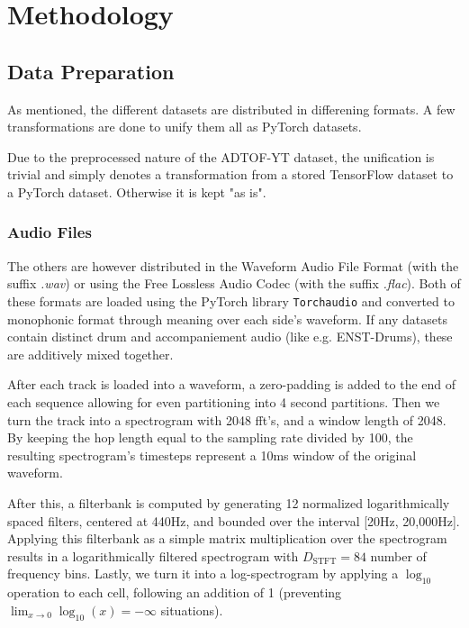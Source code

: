 \chapter{Methodology}

\section{Data Preparation}

As mentioned, the different datasets are distributed in differening formats. A few transformations are done to unify them all as PyTorch datasets.

Due to the preprocessed nature of the ADTOF-YT dataset, the unification is trivial and simply denotes a transformation from a stored TensorFlow dataset to a PyTorch dataset. Otherwise it is kept "as is".

\subsection{Audio Files}

The others are however distributed in the Waveform Audio File Format (with the suffix \textit{.wav}) or using the Free Lossless Audio Codec (with the suffix \textit{.flac}). Both of these formats are loaded using the PyTorch library \texttt{Torchaudio} and converted to monophonic format through meaning over each side's waveform. If any datasets contain distinct drum and accompaniement audio (like e.g. ENST-Drums), these are additively mixed together.

After each track is loaded into a waveform, a zero-padding is added to the end of each sequence allowing for even partitioning into 4 second partitions. Then we turn the track into a spectrogram with 2048 fft's, and a window length of 2048. By keeping the hop length equal to the sampling rate divided by 100, the resulting spectrogram's timesteps represent a 10ms window of the original waveform.

After this, a filterbank is computed by generating 12 normalized logarithmically spaced filters, centered at 440Hz, and bounded over the interval [20Hz, 20,000Hz]. Applying this filterbank as a simple matrix multiplication over the spectrogram results in a logarithmically filtered spectrogram with $D_\text{STFT} = 84$ number of frequency bins. Lastly, we turn it into a log-spectrogram by applying a $\log_{10}$ operation to each cell, following an addition of 1 (preventing $\lim_{x \to 0}\log_{10}(x) = -\infty$ situations).

